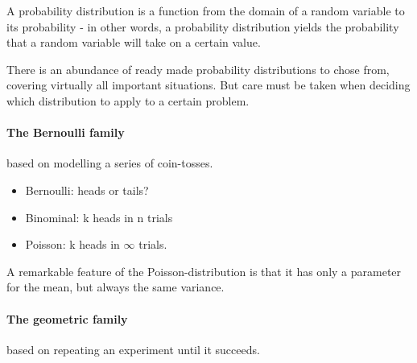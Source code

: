 A probability distribution is a function from the domain of a random variable to its probability - in other words, a probability distribution yields the probability that a random variable will take on a certain value. 

There is an abundance of ready made probability distributions to chose from, covering virtually all important situations. But care must be taken when deciding which distribution to apply to a certain problem. 

\paragraph{The Bernoulli family} based on modelling a series of coin-tosses.
\begin{itemize}
    \item Bernoulli: heads or tails?
    \item Binominal: k heads in n trials
    \item Poisson: k heads in $\infty$ trials. 
\end{itemize}
A remarkable feature of the Poisson-distribution is that it has only a parameter for the mean, but always the same variance.

\paragraph{The geometric family} based on repeating an experiment until it succeeds. 
